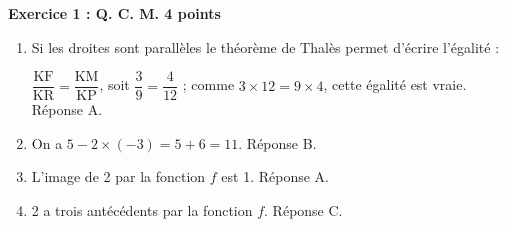 \textbf{Exercice 1 : Q. C. M. \hfill 4 points}

\medskip

%
%
% 
%
%
\begin{enumerate}
\item 

Si les droites sont parallèles le théorème de Thalès permet d'écrire l'égalité :

$\dfrac{\text{KF}}{\text{KR}} = \dfrac{\text{KM}}{\text{KP}}$, soit $\dfrac{3}{9} = \dfrac{4}{12}$ ; comme $3 \times 12 = 9 \times 4$, cette égalité est vraie. Réponse A.
\item On a $5 - 2\times (- 3) = 5 + 6 = 11$. Réponse B.
\item L'image de 2 par la fonction $f$ est 1. Réponse A.
\item 2 a trois antécédents par la fonction $f$. Réponse C.
\end{enumerate}
\vspace{0,5cm}

